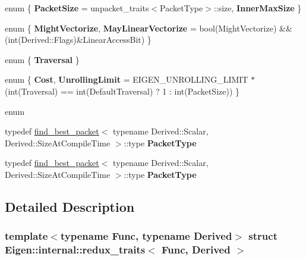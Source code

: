\begin{DoxyCompactItemize}
enum \{ {\bfseries Packet\+Size} = unpacket\+\_\+traits$<$Packet\+Type$>$\+:\+:size, 
{\bfseries Inner\+Max\+Size}
 \}
\item 
\mbox{\label{struct_eigen_1_1internal_1_1redux__traits_a91d3e052d657424129688e8709884283}} 
enum \{ {\bfseries Might\+Vectorize}, 
{\bfseries May\+Linear\+Vectorize} = bool(Might\+Vectorize) \&\& (int(Derived\+:\+:Flags)\&Linear\+Access\+Bit)
 \}
\item 
\mbox{\label{struct_eigen_1_1internal_1_1redux__traits_a15c347ab21ee7845d743aa34cd858ddc}} 
enum \{ {\bfseries Traversal}
 \}
\item 
\mbox{\label{struct_eigen_1_1internal_1_1redux__traits_a214722fe4f35b3d6572e6537e0d66186}} 
enum \{ {\bfseries Cost}, 
{\bfseries Unrolling\+Limit} = E\+I\+G\+E\+N\+\_\+\+U\+N\+R\+O\+L\+L\+I\+N\+G\+\_\+\+L\+I\+M\+IT $\ast$ (int(Traversal) == int(Default\+Traversal) ? 1 \+: int(Packet\+Size))
 \}
\item 
\mbox{\label{struct_eigen_1_1internal_1_1redux__traits_a30a0c284123310d33a76836083dd97e5}} 
enum 
\item 
\mbox{\label{struct_eigen_1_1internal_1_1redux__traits_a575f9776864cca5fe374369e42237c90}} 
typedef \hyperlink{struct_eigen_1_1internal_1_1find__best__packet}{find\+\_\+best\+\_\+packet}$<$ typename Derived\+::\+Scalar, Derived\+::\+Size\+At\+Compile\+Time $>$\+::type {\bfseries Packet\+Type}
\item 
\mbox{\label{struct_eigen_1_1internal_1_1redux__traits_a575f9776864cca5fe374369e42237c90}} 
typedef \hyperlink{struct_eigen_1_1internal_1_1find__best__packet}{find\+\_\+best\+\_\+packet}$<$ typename Derived\+::\+Scalar, Derived\+::\+Size\+At\+Compile\+Time $>$\+::type {\bfseries Packet\+Type}
\end{DoxyCompactItemize}


\subsection{Detailed Description}
\subsubsection*{template$<$typename Func, typename Derived$>$\newline
struct Eigen\+::internal\+::redux\+\_\+traits$<$ Func, Derived $>$}



